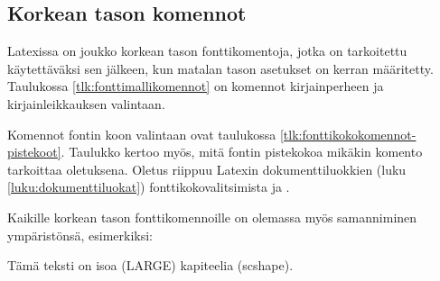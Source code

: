 \subsection{Korkean tason komennot}

Latexissa on joukko korkean tason fontti\-komentoja, jotka on
tarkoitettu käytettäväksi sen jälkeen, kun matalan tason asetukset on
kerran määritetty. Taulukossa \ref{tlk:fonttimallikomennot} on komennot
kirjainperheen ja kirjainleikkauksen valintaan.

Komennot fontin koon valintaan ovat taulukossa
\ref{tlk:fonttikokokomennot-pistekoot}. Taulukko kertoo myös, mitä
fontin pistekokoa mikäkin komento tarkoittaa oletuksena. Oletus riippuu
Latexin dokumenttiluokkien (luku \ref{luku:dokumenttiluokat})
fonttikokovalitsimista \koodi{10pt, 11pt} ja \koodi{12pt}.

Kaikille korkean tason fonttikomennoille on olemassa myös samanniminen
ympäristönsä, esimerkiksi:

\begin{koodilohkosis}
  \begin{LARGE}
    \begin{scshape}
      Tämä teksti on isoa (LARGE) kapiteelia (scshape).
    \end{scshape}
  \end{LARGE}
\end{koodilohkosis}


